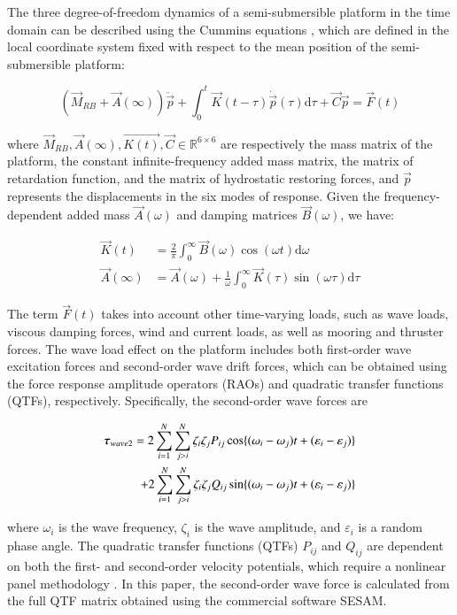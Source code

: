 \begin{sloppypar}
The three degree-of-freedom dynamics of a semi-submersible platform in the time domain can be described using the Cummins equations \cite{cao2010effects}, which are defined in the local coordinate system fixed with respect to the mean position of the semi-submersible platform:

\begin{equation}
(\vec{M}_{RB} + \vec{A}(\infty))\ddot{\vec{p}} + \int_{0}^{t}\vec{K}(t-\tau)\dot{\vec{p}}(\tau)\mathrm{d}\tau + \vec{C}\vec{p} = \vec{F}(t)
\end{equation}

\noindent where $\vec{M}_{RB}, \vec{A}(\infty), \vec{K(t)}, \vec{C} \in\mathbb{R}^{6\times6}$ are respectively the mass matrix of the platform, the constant infinite-frequency added mass matrix, the matrix of retardation function, and the matrix of hydrostatic restoring forces, and $\vec{p}$ represents the displacements in the six modes of response. Given the frequency-dependent added mass $\vec{A}(\omega)$ and damping matrices $\vec{B}(\omega)$, we have:

\begin{align}
\vec{K}(t) &= \frac{2}{\pi}\int_{0}^{\infty}\vec{B}(\omega)\cos(\omega t)\mathrm{d}\omega \\
\vec{A}(\infty) &= \vec{A}(\omega) + \frac{1}{\omega}\int_{0}^{\infty}\vec{K}(\tau)\sin(\omega \tau)\mathrm{d}\tau
\end{align}

The term $\vec{F}(t)$ takes into account other time-varying loads, such as wave loads, viscous damping forces, wind and current  loads, as well as mooring and thruster forces. The wave load effect on the platform includes both first-order wave excitation forces and second-order wave drift forces, which can be obtained using the force response amplitude operators (RAOs) and quadratic transfer functions (QTFs), respectively. Specifically, the second-order wave forces are 

\begin{equation}
	\begin{split}
	\vec {\tau}_{wave2}  = 2\sum_{i=1}^{N}\sum_{j>i}^{N}\zeta_{i}\zeta_{j}P_{ij}\cos\{(\omega_{i}-\omega_{j})t+(\varepsilon_{i}-\varepsilon_{j})\}\\
	+ 2\sum_{i=1}^{N}\sum_{j>i}^{N}\zeta_{i}\zeta_{j}Q_{ij}\sin\{(\omega_{i}-\omega_{j})t+(\varepsilon_{i}-\varepsilon_{j})\}{\rm}
	\end{split}
\end{equation}

where $ \omega_{i} $ is the wave frequency, $ \zeta_{i} $ is the wave amplitude, and $ \varepsilon_{i} $ is a random phase angle. The quadratic transfer functions (QTFs) $ P_{ij} $ and $ Q_{ij} $ are dependent on both the first- and second-order velocity potentials, which require a nonlinear panel methodology \cite{pinkster1980low}. In this paper, the second-order wave force is calculated from the full QTF matrix obtained using the commercial software SESAM.


\end{sloppypar}
